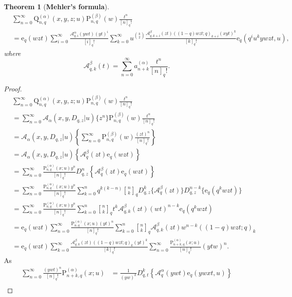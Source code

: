 \documentclass[12pt]{article}
\newcommand{\qbinom}{\genfrac{[}{]}{0pt}{}}
\newcommand{\e}{\mathrm{e}}
\newcommand{\A}{\mathcal{A}}
\newcommand{\p}{\mathrm{P}}
\newcommand{\q}{\mathrm{Q}}
\newcommand{\Aa}{\mathscr{A}}
\newtheorem{theorem}{Theorem}
\begin{document}
\begin{theorem}[{\bf Mehler's formula}]
    \begin{align}
        &\sum_{n=0}^{\infty}\q_{n,q}^{(\alpha)}(x,y,z;u)\p_{n,q}^{(\beta)}(w)\frac{t^n}{[n]_{q}!}\nonumber\\
        &=\e_{q}(wzt)\sum_{i=0}^{\infty}\frac{\A_{q,i}^{\alpha}(ywt)(yt)^i}{[i]_{q}!}\sum_{k=0}^{\infty}u^{\binom{k}{2}}\frac{\A_{q,k+i}^{\beta}(zt)((1-q)wzt;q)_{k+i}(xyt)^k}{[k]_{q}!}\e_{q}(q^{i}u^{k}ywzt,u),
    \end{align}
where
\begin{equation}
    \A_{q,k}^{\beta}(t)=\sum_{n=0}^{\infty}a_{n+k}^{(\alpha)}\frac{t^n}{[n]_{q}!}.
\end{equation}
\end{theorem}
\begin{proof}
    \begin{align*}
        &\sum_{n=0}^{\infty}\q_{n,q}^{(\alpha)}(x,y,z;u)\p_{n,q}^{(\beta)}(w)\frac{t^n}{[n]_{q}!}\\
        &=\sum_{n=0}^{\infty}\Aa_{\alpha}(x,y,D_{q,z}|u)\{z^n\}\p_{n,q}^{(\beta)}(w)\frac{t^n}{[n]_{q}!}\\
        &=\Aa_{\alpha}(x,y,D_{q,z}|u)\left\{\sum_{n=0}^{\infty}\p_{n,q}^{(\beta)}(w)\frac{(zt)^n}{[n]_{q}!}\right\}\\
        &=\Aa_{\alpha}(x,y,D_{q,z}|u)\left\{\A_{q}^{\beta}(zt)\e_{q}(wzt)\right\}\\
        &=\sum_{n=0}^{\infty}\frac{\p_{n,q}^{(\alpha)}(x;u)y^{n}}{[n]_{q}!}D_{q,z}^{n}\left\{\A_{q}^{\beta}(zt)\e_{q}(wzt)\right\}\\
        &=\sum_{n=0}^{\infty}\frac{\p_{n,q}^{(\alpha)}(x;u)y^{n}}{[n]_{q}!}\sum_{k=0}^{n}q^{k(k-n)}\qbinom{n}{k}_{q}D_{q,z}^{k}\{\A_{q}^{\beta}(zt)\}D_{q,z}^{n-k}\{\e_{q}(q^{k}wzt)\}\\
        &=\sum_{n=0}^{\infty}\frac{\p_{n,q}^{(\alpha)}(x;u)y^{n}}{[n]_{q}!}\sum_{k=0}^{n}\qbinom{n}{k}_{q}t^k\A_{q,k}^{\beta}(zt)(wt)^{n-k}\e_{q}(q^{k}wzt)\\
        &=\e_{q}(wzt)\sum_{n=0}^{\infty}\frac{\p_{n,q}^{(\alpha)}(x;u)(yt)^{n}}{[n]_{q}!}\sum_{k=0}^{n}\qbinom{n}{k}_{q}\A_{q,k}^{\beta}(zt)w^{n-k}((1-q)wzt;q)_{k}\\
        &=\e_{q}(wzt)\sum_{k=0}^{\infty}\frac{\A_{q,k}^{\beta}(zt)((1-q)wzt;q)_{k}(yt)^k}{[k]_{q}!}\sum_{n=0}^{\infty}\frac{\p_{n+k,q}^{(\alpha)}(x;u)}{[n]_{q}!}(ytw)^{n}.
    \end{align*}
As
\begin{align*}
    \sum_{n=0}^{\infty}\frac{(ywt)^{n}}{[n]_{q}!}\p_{n+k,q}^{(\alpha)}(x;u)&=\frac{1}{(yw)^k}D_{q,t}^k\left\{\A_{q}^{\alpha}(ywt)\e_{q}(ywxt,u)\right\}\\

\end{align*}
\end{proof}
\end{document}
